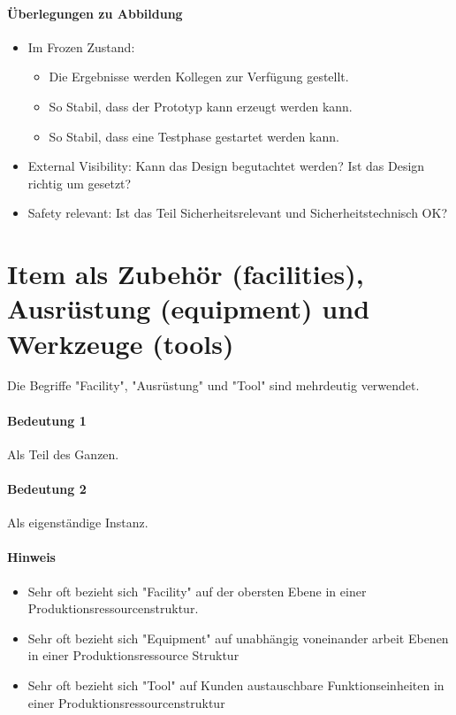 
\paragraph{Überlegungen zu Abbildung }
\begin{itemize}
\item{
Im Frozen Zustand:
\begin{itemize}
\item Die Ergebnisse werden Kollegen zur Verfügung gestellt.
\item So Stabil, dass der Prototyp kann erzeugt werden kann.
\item So Stabil, dass eine Testphase gestartet werden kann.
\end{itemize}
}
\item External Visibility: Kann das Design begutachtet werden? Ist das Design richtig um gesetzt?
\item Safety relevant: Ist das Teil Sicherheitsrelevant und Sicherheitstechnisch OK? 
\end{itemize}

\newpage
\section{Item als Zubehör (facilities), Ausrüstung (equipment) und Werkzeuge (tools)}
Die Begriffe "Facility", "Ausrüstung" und "Tool" sind mehrdeutig verwendet.

\paragraph{Bedeutung 1}
Als Teil des Ganzen.

\paragraph{Bedeutung 2}
Als eigenständige Instanz.

\paragraph{Hinweis}
\begin{itemize}
\item Sehr oft bezieht sich "Facility" auf der obersten Ebene in einer Produktionsressourcenstruktur.
\item Sehr oft bezieht sich "Equipment" auf unabhängig voneinander arbeit Ebenen in einer Produktionsressource Struktur 
\item Sehr oft bezieht sich "Tool" auf Kunden austauschbare Funktionseinheiten in einer Produktionsressourcenstruktur
\end{itemize}

